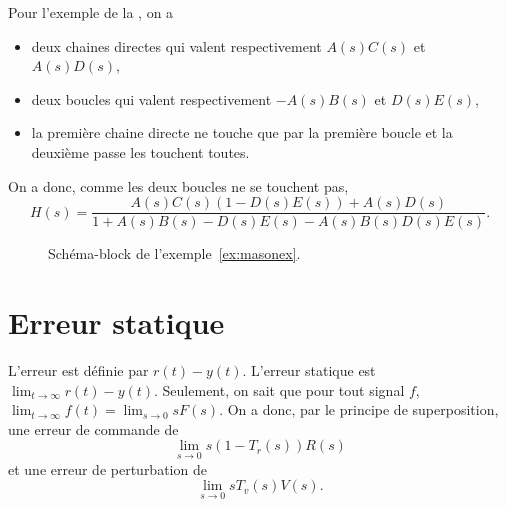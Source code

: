 \begin{myexem}
  \label{ex:masonex}
  Pour l'exemple de la , on a
  \begin{itemize}
    \item deux chaines directes qui valent respectivement $A(s)C(s)$ et $A(s)D(s)$,
    \item deux boucles qui valent respectivement $-A(s)B(s)$ et $D(s)E(s)$,
    \item la première chaine directe ne touche que par la première boucle et la deuxième passe les touchent toutes.
  \end{itemize}
  On a donc, comme les deux boucles ne se touchent pas,
  \[ H(s) = \frac{A(s)C(s)(1 - D(s)E(s)) + A(s)D(s)}{1 + A(s)B(s) - D(s)E(s) - A(s)B(s)D(s)E(s)}. \]
  \begin{figure}[!ht]
    \centering
    \caption{Schéma-block de l'exemple~\ref{ex:masonex}.}
    \label{fig:masonex}
  \end{figure}
\end{myexem}

\section{Erreur statique}
L'erreur est définie par $r(t) - y(t)$.
L'erreur statique est $\lim_{t\to\infty} r(t) - y(t)$.
Seulement, on sait que pour tout signal $f$, $\lim_{t\to\infty} f(t) = \lim_{s \to 0} sF(s)$.
On a donc, par le principe de superposition,
une erreur de commande de
\[ \lim_{s \to 0} s(1 - T_r(s))R(s) \]
et une erreur de perturbation de
\[ \lim_{s \to 0} sT_v(s)V(s). \]

